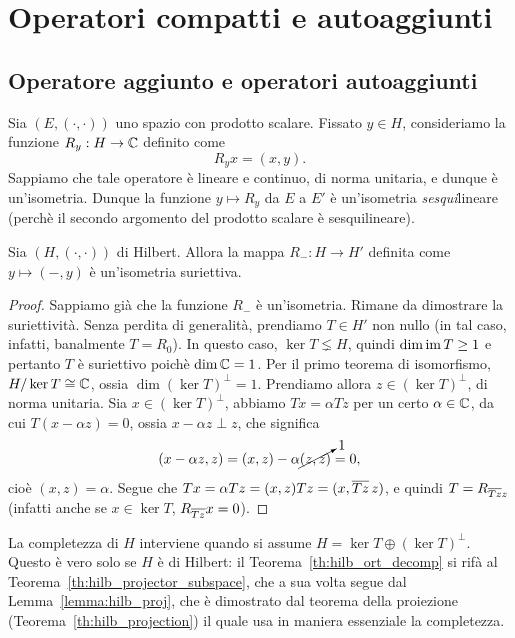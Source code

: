 \chapter{Operatori compatti e autoaggiunti}

\section{Operatore aggiunto e operatori autoaggiunti}
Sia $(E, (\cdot, \cdot))$ uno spazio con prodotto scalare.
Fissato $y \in H$, consideriamo la funzione $R_y : H \to \mathbb{C}$ definito come
\begin{equation*}
	R_y x = (x,y).
\end{equation*}
Sappiamo che tale operatore è lineare e continuo, di norma unitaria, e dunque è un'isometria. Dunque la funzione $y \mapsto R_y$ da $E$ a $E'$ è un'isometria \emph{sesqui}lineare (perchè il secondo argomento del prodotto scalare è sesquilineare).

\begin{theorem}[Riesz]
\label{eq:ops_riesz}
	Sia $(H, (\cdot,\cdot))$ di Hilbert.
	Allora la mappa $R_-: H \to H'$ definita come $y \mapsto (-, y)$ è un'isometria suriettiva.
\end{theorem}
\begin{proof}
	Sappiamo già che la funzione $R_-$ è un'isometria. Rimane da dimostrare la suriettività.
	Senza perdita di generalità, prendiamo $T \in H'$ non nullo (in tal caso, infatti, banalmente $T=R_0$).
	In questo caso, $\ker T \lneq H$, quindi $\dim \operatorname{im} T \geq 1$ e pertanto $T$ è suriettivo poichè $\dim \mathbb{C} = 1$.
	Per il primo teorema di isomorfismo, $H/\ker T \overset{}{\cong} \mathbb{C}$, ossia $\dim(\ker T)^\perp = 1$.
	Prendiamo allora $z \in (\ker T)^\perp$, di norma unitaria.
	Sia $x \in (\ker T)^\perp$, abbiamo $Tx = \alpha Tz$ per un certo $\alpha \in \mathbb{C}$, da cui $T(x-\alpha z) = 0$, ossia $x-\alpha z \perp z$, che significa
	\begin{equation*}
		(x-\alpha z, z) = (x,z) - \alpha \cancelto{1}{(z,z)} = 0,
	\end{equation*}
	cioè $(x,z) = \alpha$. Segue che $Tx = \alpha Tz = (x,z)Tz = (x, \overline{Tz}\, z)$, e quindi $T = R_{\overline{Tz} z}$ (infatti anche se $x \in \ker T$, $R_{\overline{Tz}}x = 0$).
\end{proof}

\begin{remark}
	La completezza di $H$ interviene quando si assume ${H = \ker T \oplus (\ker T)^\perp}$. Questo è vero solo se $H$ è di Hilbert: il Teorema~\ref{th:hilb_ort_decomp} si rifà al Teorema~\ref{th:hilb_projector_subspace}, che a sua volta segue dal Lemma~\ref{lemma:hilb_proj}, che è dimostrato dal teorema della proiezione (Teorema~\ref{th:hilb_projection}) il quale usa in maniera essenziale la completezza.
\end{remark}

